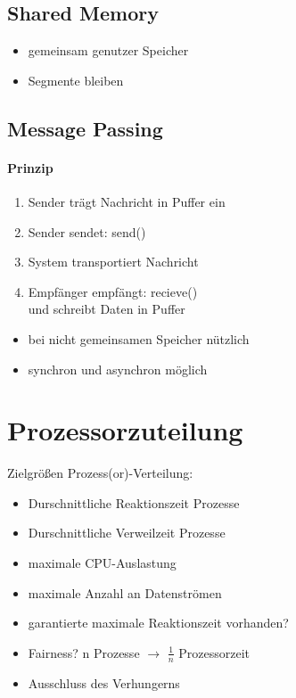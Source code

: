 \subsection{Shared Memory}
\begin{itemize}
\item gemeinsam genutzer Speicher
\item Segmente bleiben 
\end{itemize}

\subsection{Message Passing}
\paragraph{Prinzip}
\begin{enumerate}
\item Sender trägt Nachricht in Puffer ein
\item Sender sendet: send()
\item System transportiert Nachricht
\item Empfänger empfängt: recieve()\\
und schreibt Daten in Puffer
\end{enumerate}
\begin{itemize}
\item bei nicht gemeinsamen Speicher nützlich
\item synchron und asynchron möglich
\end{itemize}

\section{Prozessorzuteilung}
Zielgrößen Prozess(or)-Verteilung:
\begin{itemize}
\item Durschnittliche Reaktionszeit Prozesse
\item Durschnittliche Verweilzeit Prozesse
\item maximale CPU-Auslastung
\item maximale Anzahl an Datenströmen
\item garantierte maximale Reaktionszeit vorhanden?
\item Fairness? n Prozesse $\to$ $\tfrac{1}{n}$ Prozessorzeit
\item Ausschluss des Verhungerns
\end{itemize}

